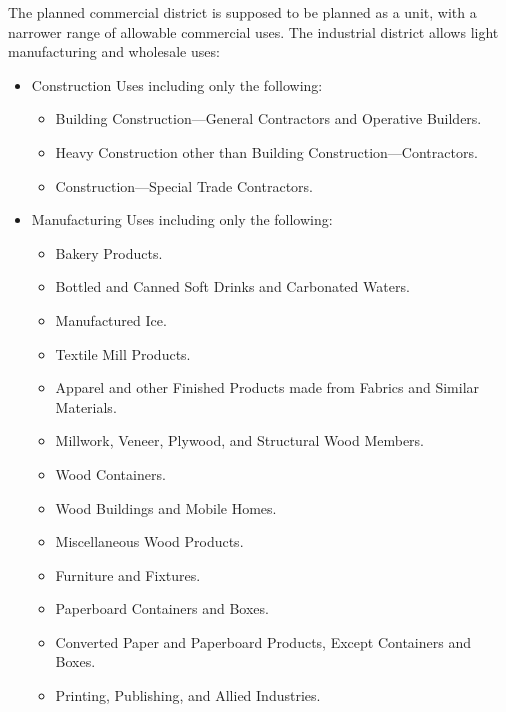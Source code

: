 The planned commercial district is supposed to be planned as a unit, with a
narrower range of allowable commercial uses. The industrial district allows
light manufacturing and wholesale uses:
\begin{itemize}
\item Construction Uses including only the following:
\begin{itemize}
\item Building Construction---General Contractors and Operative Builders.

\item Heavy Construction other than Building Construction---Contractors.

\item Construction---Special Trade Contractors.
\end{itemize}
\item Manufacturing Uses including only the following:
\begin{itemize}
\item Bakery Products.

\item Bottled and Canned Soft Drinks and Carbonated Waters.

\item Manufactured Ice.

\item Textile Mill Products.

\item Apparel and other Finished Products made from Fabrics and Similar
Materials.

\item Millwork, Veneer, Plywood, and Structural Wood Members.

\item Wood Containers.

\item Wood Buildings and Mobile Homes.

\item Miscellaneous Wood Products.

\item Furniture and Fixtures.

\item Paperboard Containers and Boxes.

\item Converted Paper and Paperboard Products, Except Containers and Boxes.

\item Printing, Publishing, and Allied Industries.


\end{itemize}
\end{itemize}
